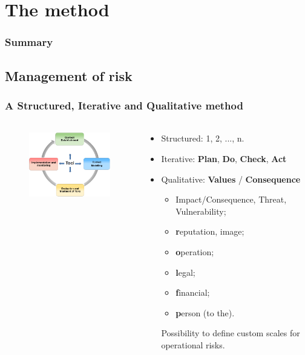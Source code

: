 
%
%
\section{The method}
\begin{frame}
    \frametitle{Summary}
\end{frame}


\subsection{Management of risk}
\begin{frame}
    \frametitle{A Structured, Iterative and Qualitative method}
    \framesubtitle{}
    \begin{columns}[t]
        \begin{column}{5.5cm}
            \begin{figure}
            \includegraphics[width=5.5cm]{../common_pictures/MONARC-method-1.png}
            \end{figure}
        \end{column}
        \begin{column}{6.5cm}
            \begin{itemize}
                \item Structured: 1, 2, ..., n.
                \item Iterative: \textbf{Plan}, \textbf{Do}, \textbf{Check}, \textbf{Act}
                \item Qualitative: \textbf{Values} / \textbf{Consequence}
                \begin{itemize}
                    \item Impact/Consequence, Threat, Vulnerability;
                    \item \textbf{r}eputation, image;
                    \item \textbf{o}peration;
                    \item \textbf{l}egal;
                    \item \textbf{f}inancial;
                    \item \textbf{p}erson (to the).
                \end{itemize}
                    Possibility to define custom scales for operational risks.
            \end{itemize}
        \end{column}
    \end{columns}
\end{frame}

